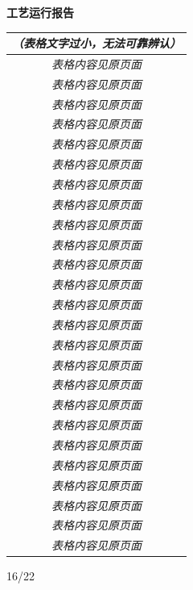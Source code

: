 \documentclass[UTF8,10pt,a4paper,fontset=fandol]{ctexart}
\newcommand{\handwritten}[1]{#1}
\begin{document}
\hfill
\begin{minipage}[t]{0.47\textwidth}
\centering
\textbf{工艺运行报告}

\vspace{0.3em}
\small
\begin{tabularx}{\linewidth}{|c|X|}
\hline
\multicolumn{2}{c}{\textit{（表格文字过小，无法可靠辨认）}}\\
\hline
\multicolumn{2}{c}{\textit{表格内容见原页面}}\\
\hline
\multicolumn{2}{c}{\textit{表格内容见原页面}}\\
\hline
\multicolumn{2}{c}{\textit{表格内容见原页面}}\\
\hline
\multicolumn{2}{c}{\textit{表格内容见原页面}}\\
\hline
\multicolumn{2}{c}{\textit{表格内容见原页面}}\\
\hline
\multicolumn{2}{c}{\textit{表格内容见原页面}}\\
\hline
\multicolumn{2}{c}{\textit{表格内容见原页面}}\\
\hline
\multicolumn{2}{c}{\textit{表格内容见原页面}}\\
\hline
\multicolumn{2}{c}{\textit{表格内容见原页面}}\\
\hline
\multicolumn{2}{c}{\textit{表格内容见原页面}}\\
\hline
\multicolumn{2}{c}{\textit{表格内容见原页面}}\\
\hline
\multicolumn{2}{c}{\textit{表格内容见原页面}}\\
\hline
\multicolumn{2}{c}{\textit{表格内容见原页面}}\\
\hline
\multicolumn{2}{c}{\textit{表格内容见原页面}}\\
\hline
\multicolumn{2}{c}{\textit{表格内容见原页面}}\\
\hline
\multicolumn{2}{c}{\textit{表格内容见原页面}}\\
\hline
\multicolumn{2}{c}{\textit{表格内容见原页面}}\\
\hline
\multicolumn{2}{c}{\textit{表格内容见原页面}}\\
\hline
\multicolumn{2}{c}{\textit{表格内容见原页面}}\\
\hline
\multicolumn{2}{c}{\textit{表格内容见原页面}}\\
\hline
\multicolumn{2}{c}{\textit{表格内容见原页面}}\\
\hline
\multicolumn{2}{c}{\textit{表格内容见原页面}}\\
\hline
\multicolumn{2}{c}{\textit{表格内容见原页面}}\\
\hline
\multicolumn{2}{c}{\textit{表格内容见原页面}}\\
\hline
\multicolumn{2}{c}{\textit{表格内容见原页面}}\\
\hline
\end{tabularx}

\vspace{0.5em}
\handwritten{16/22}
\end{minipage}
\end{document}
